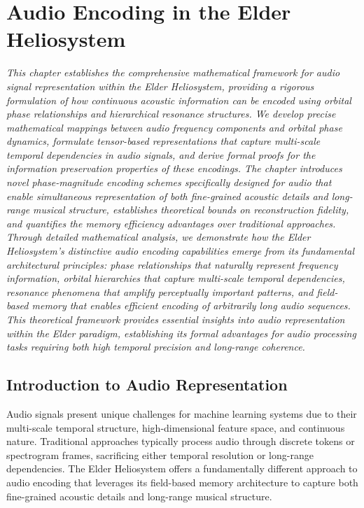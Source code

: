 \chapter{Audio Encoding in the Elder Heliosystem}

\textit{This chapter establishes the comprehensive mathematical framework for audio signal representation within the Elder Heliosystem, providing a rigorous formulation of how continuous acoustic information can be encoded using orbital phase relationships and hierarchical resonance structures. We develop precise mathematical mappings between audio frequency components and orbital phase dynamics, formulate tensor-based representations that capture multi-scale temporal dependencies in audio signals, and derive formal proofs for the information preservation properties of these encodings. The chapter introduces novel phase-magnitude encoding schemes specifically designed for audio that enable simultaneous representation of both fine-grained acoustic details and long-range musical structure, establishes theoretical bounds on reconstruction fidelity, and quantifies the memory efficiency advantages over traditional approaches. Through detailed mathematical analysis, we demonstrate how the Elder Heliosystem's distinctive audio encoding capabilities emerge from its fundamental architectural principles: phase relationships that naturally represent frequency information, orbital hierarchies that capture multi-scale temporal dependencies, resonance phenomena that amplify perceptually important patterns, and field-based memory that enables efficient encoding of arbitrarily long audio sequences. This theoretical framework provides essential insights into audio representation within the Elder paradigm, establishing its formal advantages for audio processing tasks requiring both high temporal precision and long-range coherence.}

\section{Introduction to Audio Representation}

Audio signals present unique challenges for machine learning systems due to their multi-scale temporal structure, high-dimensional feature space, and continuous nature. Traditional approaches typically process audio through discrete tokens or spectrogram frames, sacrificing either temporal resolution or long-range dependencies. The Elder Heliosystem offers a fundamentally different approach to audio encoding that leverages its field-based memory architecture to capture both fine-grained acoustic details and long-range musical structure.


